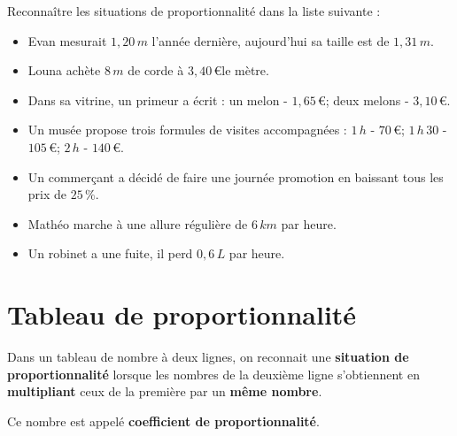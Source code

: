 \documentclass[a4paper,dvipsnames]{article}
\begin{document}
\begin{ExOApp}[]
Reconnaître les situations de proportionnalité dans la liste suivante :
\begin{itemize}
\item Evan mesurait $1,20\,m$ l'année dernière, aujourd'hui sa taille est de $1,31\,m$.
\item Louna achète $8\,m$ de corde à $3,40\,$\euro le mètre.
\item Dans sa vitrine, un primeur a écrit : un melon - $1,65\,$\euro ; deux melons - $3,10\,$\euro.
\item Un musée propose trois formules de visites accompagnées : $1\,h$ - $70\,$\euro ; $1\,h\,30$ - $105\,$\euro ; $2\,h$ - $140\,$\euro.
\item Un commerçant a décidé de faire une journée promotion en baissant tous les prix de $25\,\%$.
\item Mathéo marche à une allure régulière de $6\,km$ par heure.
\item Un robinet a une fuite, il perd $0,6\,L$ par heure.
\end{itemize}
\end{ExOApp}

\section{Tableau de proportionnalité}

\begin{Def}
Dans un tableau de nombre à deux lignes, on reconnait une \textbf{situation de proportionnalité} lorsque les nombres de la deuxième ligne s'obtiennent en \textbf{multipliant} ceux de la première par un \textbf{même nombre}.

Ce nombre est appelé \textbf{coefficient de proportionnalité}.
\end{Def}
\end{document}
